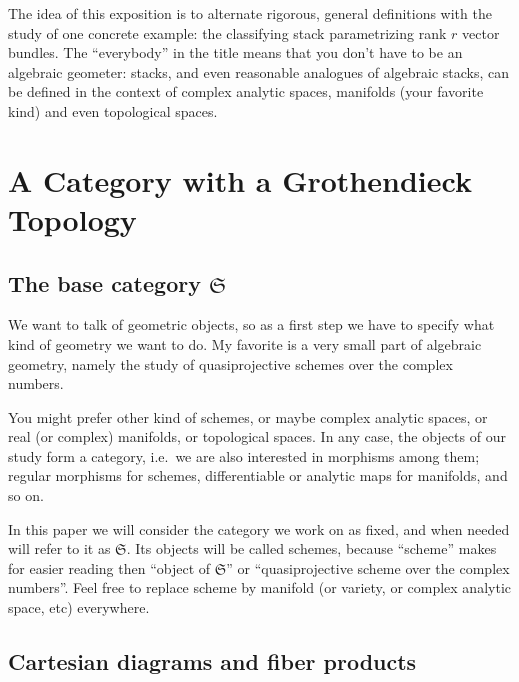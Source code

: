 \documentclass[12pt]{memoir}
\begin{document}
The idea of this exposition is to alternate rigorous, general definitions with the study of one concrete example: the classifying stack parametrizing rank $r$ vector bundles. The ``everybody'' in the title means that you don't have to be an algebraic geometer: stacks, and even reasonable analogues of algebraic stacks, can be defined in the context of complex analytic spaces, manifolds (your favorite kind) and even topological spaces.

\section{A Category with a Grothendieck Topology}

\subsection{The base category $\mathfrak{S}$}

We want to talk of geometric objects, so as a first step we have to specify what kind of geometry we want to do. My favorite is a very small part of algebraic geometry, namely the study of quasiprojective schemes over the complex numbers.


You might prefer other kind of schemes, or maybe complex analytic spaces, or real (or complex) manifolds, or topological spaces. In any case, the objects of our study form a category, i.e.\ we are also interested in morphisms among them; regular morphisms for schemes, differentiable or analytic maps for manifolds, and so on.

In this paper we will consider the category we work on as fixed, and when needed will refer to it as $\mathfrak{S}$. Its objects will be called schemes, because ``scheme'' makes for easier reading then ``object of $\mathfrak{S}$'' or ``quasiprojective scheme over the complex numbers''. Feel free to replace scheme by manifold (or variety, or complex analytic space, etc) everywhere.

\subsection{Cartesian diagrams and fiber products}
\end{document}
